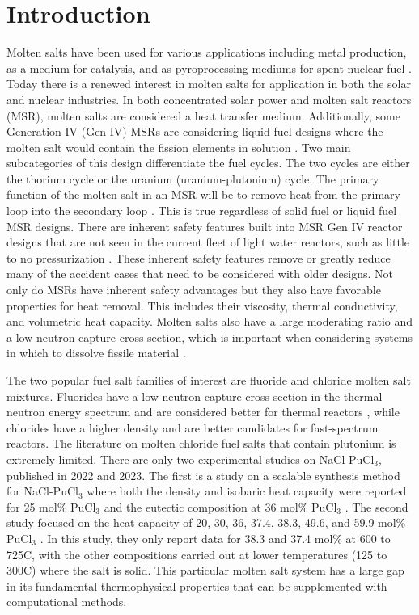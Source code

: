 \documentclass[review]{elsarticle}
\begin{document}

\section{Introduction}
Molten salts have been used for various applications including metal production\cite{Zhu2014, VAHIDI2018178}, as a medium for catalysis\cite{JIN20202382, HU20204244}, and as pyroprocessing mediums for spent nuclear fuel \cite{CHOI2015572, osti_22107867}. Today there is a renewed interest in molten salts for application in both the solar and nuclear industries. In both concentrated solar power and molten salt reactors (MSR), molten salts are considered a heat transfer medium. Additionally, some Generation IV (Gen IV) MSRs are considering liquid fuel designs where the molten salt would contain the fission elements in solution \cite{doi:10.1080/00295450.2019.1586372}. Two main subcategories of this design differentiate the fuel cycles. The two cycles are either the thorium cycle or the uranium (uranium-plutonium) cycle. The primary function of the molten salt in an MSR will be to remove heat from the primary loop into the secondary loop \cite{gakhar2021molten}. This is true regardless of solid fuel or liquid fuel MSR designs. There are inherent safety features built into MSR Gen IV reactor designs that are not seen in the current fleet of light water reactors, such as little to no pressurization \cite{leblanc2017integral}. These inherent safety features remove or greatly reduce many of the accident cases that need to be considered with older designs. Not only do MSRs have inherent safety advantages but they also have favorable properties for heat removal. This includes their viscosity, thermal conductivity, and volumetric heat capacity. Molten salts also have a large moderating ratio and a low neutron capture cross-section, which is important when considering systems in which to dissolve fissile material \cite{williams2006assessment}.

The two popular fuel salt families of interest are fluoride and chloride molten salt mixtures. Fluorides have a low neutron capture cross section in the thermal neutron energy spectrum and are considered better for thermal reactors \cite{williams2006assessment}, while chlorides have a higher density and are better candidates for fast-spectrum reactors. The literature on molten chloride fuel salts that contain plutonium is extremely limited. There are only two experimental studies on NaCl-PuCl$_3$, published in 2022 and 2023. The first is a study on a scalable synthesis method for NaCl-PuCl$_3$ where both the density and isobaric heat capacity were reported for 25 mol\% PuCl$_3$ and the eutectic composition at 36 mol\% PuCl$_3$ \cite{karlsson2022synthesis}. The second study focused on the heat capacity of 20, 30, 36, 37.4, 38.3, 49.6, and 59.9 mol\% PuCl$_3$ \cite{lichtenstein2022property}. In this study, they only report data for 38.3 and 37.4 mol\% at 600 to 725\degree C, with the other compositions carried out at lower temperatures (125 to 300\degree C) where the salt is solid. This particular molten salt system has a large gap in its fundamental thermophysical properties that can be supplemented with computational methods.
\end{document}
